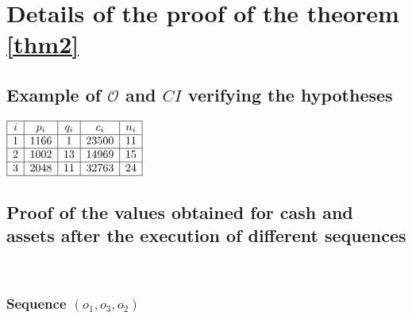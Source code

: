 \documentclass[a4paper]{article}
\newcommand{\Oc}{\mathcal{O}}
\newtheorem[style=S, bodystyle=\noindent]{thm}{Theorem}[section]
\newtheorem[style=S, bodystyle=\noindent]{defn}[thm]{Definition}
\newtheorem[style=S, bodystyle=\noindent]{propo}[thm]{Proposition}
\newtheorem[style=S, bodystyle=\noindent]{prop}[thm]{Property}
\newtheorem[style=S, bodystyle=\noindent]{coro}[thm]{Corollary}
\newtheorem[style=S, bodystyle=\noindent]{lem}[thm]{Lemma}
\newtheorem[style=S, headstyle=\bfseries\boldmath Theorem, bodystyle=\noindent]{thm*}{Theorem}
\newtheorem[style=S, headstyle=\bfseries\boldmath Definition, bodystyle=\noindent]{defn*}{Definition}
\newtheorem[style=S, headstyle=\bfseries\boldmath Proposition, bodystyle=\noindent]{propo*}{Proposition}
\newtheorem[style=S, headstyle=\bfseries\boldmath Property, bodystyle=\noindent]{prop*}{Property}
\newtheorem[style=S, headstyle=\bfseries\boldmath Corollary, bodystyle=\noindent]{coro*}{Corollary}
\newtheorem[style=S, headstyle=\bfseries\boldmath Lemma, bodystyle=\noindent]{lem*}{Lemma}
\begin{document}
\section{Details of the proof of the theorem \ref{thm2}}

\subsection{Example of $\Oc$ and $CI$ verifying the hypotheses}
\label{appendix3}
\begin{center}
$\begin{array}{|c|c|c|c|c|}
	\hline
	i & p_i & q_i & c_i & n_i \\
	\hline
	1 & 1166 & 1 & 23500 & 11 \\
	\hline
	2 & 1002 & 13 & 14969 & 15 \\
	\hline
	3 & 2048 & 11 & 32763 & 24 \\
	\hline
\end{array}$
\end{center}

\subsection{Proof of the values obtained for cash and assets after the execution of different sequences}
\label{appendix4}
~
\subsubsection{Sequence $(o_1,o_3,o_2)$}
\end{document}
